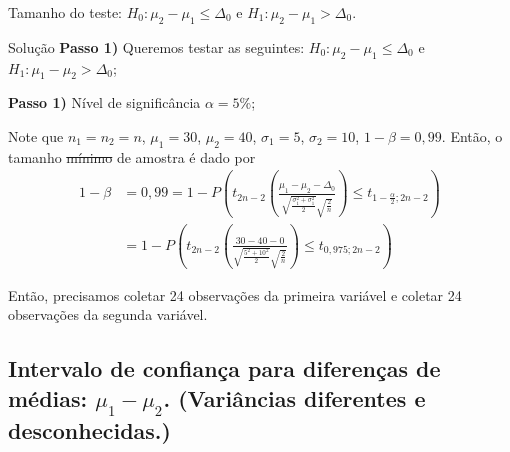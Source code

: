 \documentclass[9pt]{beamer}
\begin{document}
\begin{frame}{Tamanho do teste: $H_0: \mu_2 - \mu_1 \leq \Delta_0$ e $H_1: \mu_2 - \mu_1 > \Delta_0.$}

\begin{block}{Solução}
	\textbf{Passo 1)} Queremos testar as seguintes: $H_0: \mu_2 - \mu_1 \leq \Delta_0$ e $H_1: \mu_1 - \mu_2 > \Delta_0$;

	\textbf{Passo 1)} Nível de significância $\alpha=5\%$;
	
	Note que $n_1=n_2=n$, $\mu_1=30$, $\mu_2=40$, $\sigma_1=5$, $\sigma_2=10$, $1-\beta = 0,99$.	Então, o tamanho \sout{mínimo} de amostra é dado por
	\begin{align*}
		1- \beta &= 0,99 = 1 - P\left( t_{2n -2}\left( \frac{ \mu_1 - \mu_2 - \Delta_0 }{\sqrt{\frac{\sigma_1^2 + \sigma_1^2}{2}} \sqrt{\frac{2}{n}}} \right) \leq t_{1-\frac{\alpha}{2};2n -2} \right)\\
		&= 1 - P\left( t_{2n -2}\left( \frac{ 30 - 40 - 0 }{\sqrt{\frac{5^2 + 10^2}{2}} \sqrt{\frac{2}{n}}} \right) \leq t_{0,975;2n -2} \right)
	\end{align*}	
	
	Então, precisamos coletar 24 observações da primeira variável e coletar 24 observações da segunda variável.
\end{block}
\end{frame}



\subsection{Intervalo de confiança para diferenças de médias: $\mu_1 - \mu_2$. (Variâncias diferentes e desconhecidas.)}
\end{document}
